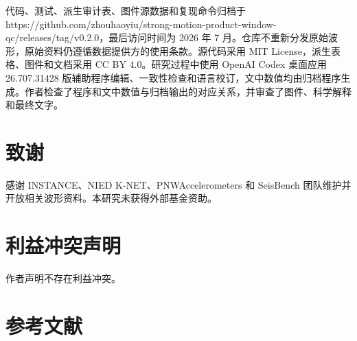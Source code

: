 \documentclass[UTF8,a4paper,zihao=5]{ctexart}
\begin{document}
代码、测试、派生审计表、图件源数据和复现命令归档于 https://github.com/zhouhaoyiu/strong-motion-product-window-qc/releases/tag/v0.2.0，最后访问时间为 2026 年 7 月。仓库不重新分发原始波形，原始资料仍遵循数据提供方的使用条款。源代码采用 MIT License，派生表格、图件和文档采用 CC BY 4.0。研究过程中使用 OpenAI Codex 桌面应用 26.707.31428 版辅助程序编辑、一致性检查和语言校订，文中数值均由归档程序生成。作者检查了程序和文中数值与归档输出的对应关系，并审查了图件、科学解释和最终文字。

\section*{致谢}\label{ux81f4ux8c22}

感谢 INSTANCE、NIED K-NET、PNWAccelerometers 和 SeisBench 团队维护并开放相关波形资料。本研究未获得外部基金资助。

\section*{利益冲突声明}\label{ux5229ux76caux51b2ux7a81ux58f0ux660e}

作者声明不存在利益冲突。

\section*{参考文献}\label{ux53c2ux8003ux6587ux732e}
\end{document}
